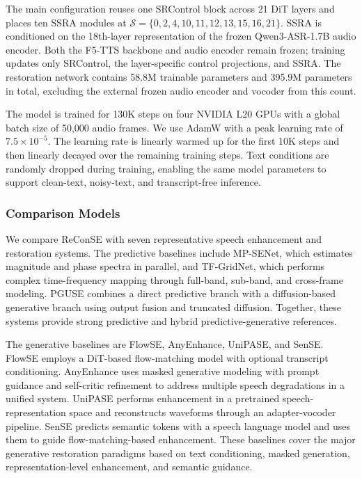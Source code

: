 \documentclass{article}
\begin{document}
The main configuration reuses one SRControl block across 21 DiT layers and places ten SSRA modules at $\mathcal{S}=\{0,2,4,10,11,12,13,15,16,21\}$. SSRA is conditioned on the 18th-layer representation of the frozen Qwen3-ASR-1.7B audio encoder. Both the F5-TTS backbone and audio encoder remain frozen; training updates only SRControl, the layer-specific control projections, and SSRA. The restoration network contains 58.8M trainable parameters and 395.9M parameters in total, excluding the external frozen audio encoder and vocoder from this count.

The model is trained for 130K steps on four NVIDIA L20 GPUs with a global batch size of 50,000 audio frames. We use AdamW with a peak learning rate of $7.5\times10^{-5}$. The learning rate is linearly warmed up for the first 10K steps and then linearly decayed over the remaining training steps. Text conditions are randomly dropped during training, enabling the same model parameters to support clean-text, noisy-text, and transcript-free inference.

\subsubsection{Comparison Models}

We compare ReConSE with seven representative speech enhancement and restoration systems. The predictive baselines include MP-SENet, which estimates magnitude and phase spectra in parallel, and TF-GridNet, which performs complex time-frequency mapping through full-band, sub-band, and cross-frame modeling. PGUSE combines a direct predictive branch with a diffusion-based generative branch using output fusion and truncated diffusion. Together, these systems provide strong predictive and hybrid predictive-generative references.

The generative baselines are FlowSE, AnyEnhance, UniPASE, and SenSE. FlowSE employs a DiT-based flow-matching model with optional transcript conditioning. AnyEnhance uses masked generative modeling with prompt guidance and self-critic refinement to address multiple speech degradations in a unified system. UniPASE performs enhancement in a pretrained speech-representation space and reconstructs waveforms through an adapter-vocoder pipeline. SenSE predicts semantic tokens with a speech language model and uses them to guide flow-matching-based enhancement. These baselines cover the major generative restoration paradigms based on text conditioning, masked generation, representation-level enhancement, and semantic guidance.
\end{document}
